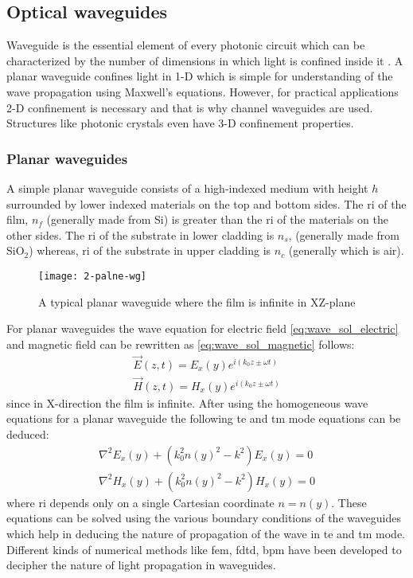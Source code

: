 \documentclass[../report.tex]{subfiles}
\begin{document}
		\subsection{Optical waveguides}
Waveguide is the essential element of every photonic circuit which can be characterized by the number of dimensions in which light is confined inside it \cite{reed_silicon_2008}. A planar waveguide confines light in 1-D which is simple for understanding of the wave propagation using Maxwell's equations. However, for practical applications 2-D confinement is necessary and that is why channel waveguides are used. Structures like photonic crystals even have 3-D confinement properties.   			
			\subsubsection{Planar waveguides}
A simple planar waveguide consists of a high-indexed medium with height $h$	surrounded by lower indexed materials on the top and bottom sides. The \gls{ri} of the film, $n_f$ (generally made from Si) is greater than the \gls{ri} of the materials on the other sides. The \gls{ri} of the substrate in lower cladding is $n_s$, (generally made from SiO$_{2}$) whereas, \gls{ri} of the substrate in upper cladding is $n_c$ (generally which is air).
\begin{figure}[H]
	\centering
	\texttt{[image: 2-palne-wg]}
	\caption{A typical planar waveguide where the film is infinite in XZ-plane}
	\label{fig:2_palne_wg}
\end{figure}
For planar waveguides the wave equation for electric field \ref{eq:wave_sol_electric} and magnetic field can be rewritten as \ref{eq:wave_sol_magnetic} follows:
\begin{equation}\label{eq:wave_sol_planar_wg}
	\begin{aligned}
	\overrightarrow{E}(z,t)=E_{x}(y)e^{i\left(k_{0}z\pm \omega t\right)}\\
	\overrightarrow{H}(z,t)=H_{x}(y)e^{i\left(k_{0}z\pm \omega t\right)}
	\end{aligned}
\end{equation}	
since in X-direction the film is infinite. After using the homogeneous wave equations for a planar waveguide the following \gls{te} and \gls{tm} mode equations can be deduced:
\begin{equation}\label{eq:homogeneous_wave_sol_planar_wg}
	\begin{aligned}
	\nabla^{2}E_x(y) + (k_{0}^{2}n(y)^{2}-k^{2}){E_{x}(y)} = 0\\
	\nabla^{2}H_x(y) + (k_{0}^{2}n(y)^{2}-k^{2}){H_{x}(y)} = 0	
	\end{aligned}
\end{equation}
where \gls{ri} depends only on a single Cartesian coordinate $n = n(y)$. These equations can be solved using the various boundary conditions of the waveguides which help in deducing the nature of propagation of the wave in \gls{te} and \gls{tm} mode. Different kinds of numerical methods like \gls{fem}, \gls{fdtd}, \gls{bpm} have been developed to decipher the nature of light propagation in waveguides.
\end{document}

